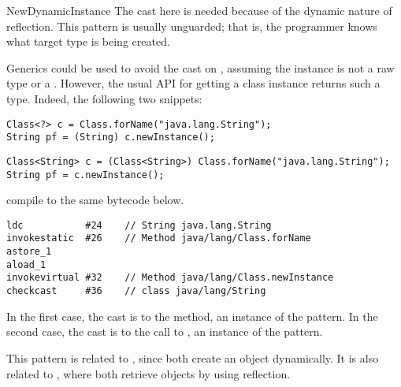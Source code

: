 \begin{pattern}{NewDynamicInstance}
\issues{}
The cast here is needed because of the dynamic nature of reflection.
This pattern is usually unguarded; that is,
the programmer knows what target type is being created.

Generics could be used to avoid the cast on , assuming the  instance is 
not a raw type or a .
However, the usual API for getting a class instance 
returns such a type.
Indeed, the following two snippets:

\begin{verbatim}
Class<?> c = Class.forName("java.lang.String");
String pf = (String) c.newInstance();
\end{verbatim}

\begin{verbatim}
Class<String> c = (Class<String>) Class.forName("java.lang.String");
String pf = c.newInstance();
\end{verbatim}

compile to the same bytecode below.

\begin{listing}
\begin{verbatim}
ldc           #24    // String java.lang.String
invokestatic  #26    // Method java/lang/Class.forName
astore_1
aload_1
invokevirtual #32    // Method java/lang/Class.newInstance
checkcast     #36    // class java/lang/String
\end{verbatim}
\end{listing}

In the first case, the cast is to the  method,
an instance of the \thisp{} pattern.
In the second case, the cast is to the call to ,
an instance of the  pattern.

This pattern is related to ,
since both create an object dynamically.
It is also related to ,
where both retrieve objects by using reflection.

\end{pattern}